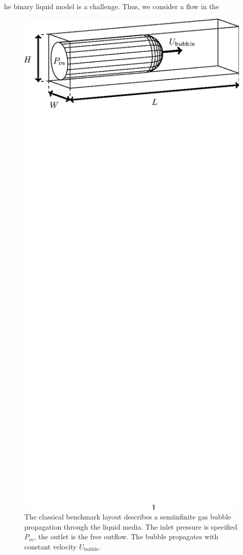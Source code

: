 \documentclass[preprint,12pt]{elsarticle}
\begin{document}
he binary liquid model is a challenge. Thus, we consider a flow in the
\begin{figure}[htb!]
\includegraphics*[bb=153 610 410 717,width=\textwidth]{benchmark_classical.eps} 
\caption{The classical benchmark layout describes a semiinfinite gas bubble
propagation through the liquid media. The inlet pressure is specified $P_{in}$, the outlet is the
free outflow. The bubble propagates with constant velocity $U_{\mathrm{bubble}}$. 
\label{fig:classical:benchmark}}
\end{figure}
\end{document}
